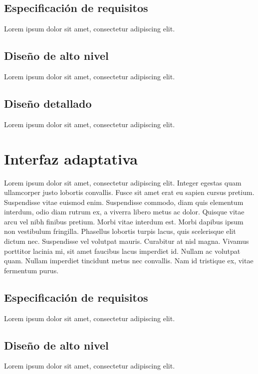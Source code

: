 \subsection{Especificación de requisitos}

Lorem ipsum dolor sit amet, consectetur adipiscing elit.

\subsection{Diseño de alto nivel}

Lorem ipsum dolor sit amet, consectetur adipiscing elit.

\subsection{Diseño detallado}

Lorem ipsum dolor sit amet, consectetur adipiscing elit.

\section{Interfaz adaptativa}

Lorem ipsum dolor sit amet, consectetur adipiscing elit. Integer egestas quam ullamcorper justo lobortis convallis. Fusce sit amet erat eu sapien cursus pretium. Suspendisse vitae euismod enim. Suspendisse commodo, diam quis elementum interdum, odio diam rutrum ex, a viverra libero metus ac dolor. Quisque vitae arcu vel nibh finibus pretium. Morbi vitae interdum est. Morbi dapibus ipsum non vestibulum fringilla. Phasellus lobortis turpis lacus, quis scelerisque elit dictum nec. Suspendisse vel volutpat mauris. Curabitur at nisl magna. Vivamus porttitor lacinia mi, sit amet faucibus lacus imperdiet id. Nullam ac volutpat quam. Nullam imperdiet tincidunt metus nec convallis. Nam id tristique ex, vitae fermentum purus.

\subsection{Especificación de requisitos}

Lorem ipsum dolor sit amet, consectetur adipiscing elit.

\subsection{Diseño de alto nivel}

Lorem ipsum dolor sit amet, consectetur adipiscing elit.


